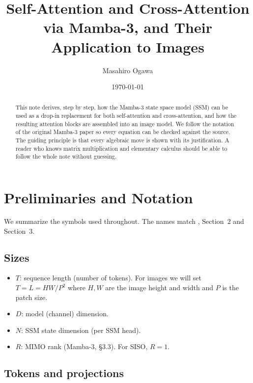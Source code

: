 \documentclass[11pt,a4paper]{article}
\title{Self-Attention and Cross-Attention via Mamba-3, and Their Application to Images}
\author{Masahiro Ogawa}
\date{\today}
\begin{document}
\maketitle

\begin{abstract}
This note derives, step by step, how the Mamba-3 state space model
(SSM) can be used as a drop-in replacement for both self-attention and
cross-attention, and how the resulting attention blocks are assembled
into an image model. We follow the notation of the original Mamba-3
paper so every equation can be checked against the source. The
guiding principle is that every algebraic move is shown with its
justification. A reader who knows matrix multiplication and
elementary calculus should be able to follow the whole note without
guessing.
\end{abstract}

\tableofcontents

\section{Preliminaries and Notation}

We summarize the symbols used throughout. The names match
\cite{mamba3}, Section~2 and Section~3.

\subsection{Sizes}

\begin{itemize}
  \item $T$: sequence length (number of tokens). For images we will
        set $T = L = HW/P^2$ where $H,W$ are the image height and
        width and $P$ is the patch size.
  \item $D$: model (channel) dimension.
  \item $N$: SSM state dimension (per SSM head).
  \item $R$: MIMO rank (Mamba-3, \S 3.3). For SISO, $R=1$.
\end{itemize}

\subsection{Tokens and projections}
\end{document}
